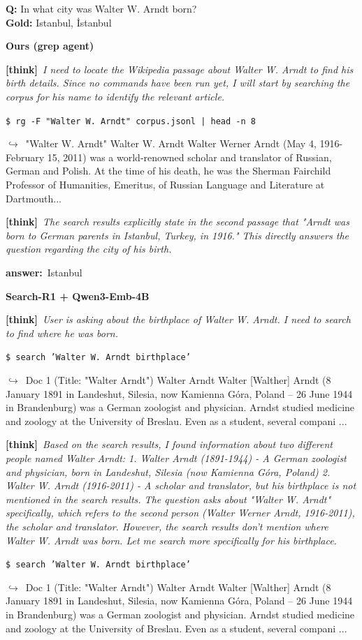 \documentclass{llmxive}
\providecommand{\cmark}{\ding{51}}
\providecommand{\xmark}{\ding{55}}
\providecommand{\winbadge}{\colorbox{green!50!black}{\scriptsize\bfseries\,WIN\,}}
\providecommand{\thk}[1]{{\footnotesize\textbf{[think]}\ \textit{#1}\par}}
\providecommand{\cmd}[1]{{\footnotesize\texttt{\$\ #1}\par}}
\providecommand{\retr}[1]{{\footnotesize\quad$\hookrightarrow$\ #1\par}}
\providecommand{\ans}[1]{{\footnotesize\textbf{answer:}\ #1\par}}
\begin{document}
\begin{cmpbox}[label={ex:popqa-arndt},title={\winbadge\ \ \textsc{PopQA -- exact name beats semantic blur}}]
\textbf{Q:} In what city was Walter W. Arndt born?\\[1pt]
\textbf{Gold:} Istanbul, İstanbul\par\smallskip
\textbf{Ours (grep agent)}~\cmark\par
  \thk{I need to locate the Wikipedia passage about Walter W. Arndt to find his birth details. Since no commands have been run yet, I will start by searching the corpus for his name to identify the relevant article.}
  \cmd{rg -F "Walter W. Arndt" corpus.jsonl | head -n 8}
  \retr{"Walter W. Arndt" Walter W. Arndt Walter Werner Arndt (May 4, 1916-February 15, 2011) was a world-renowned scholar and translator of Russian, German and Polish. At the time of his death, he was the Sherman Fairchild Professor of Humanities, Emeritus, of Russian Language and Literature at Dartmouth...}
  \thk{The search results explicitly state in the second passage that "Arndt was born to German parents in Istanbul, Turkey, in 1916." This directly answers the question regarding the city of his birth.}
  \ans{Istanbul}
\smallskip\par\textbf{Search-R1 + Qwen3-Emb-4B}~\xmark\par
  \thk{User is asking about the birthplace of Walter W. Arndt. I need to search to find where he was born.}
  \cmd{search 'Walter W. Arndt birthplace'}
  \retr{Doc 1 (Title: "Walter Arndt") Walter Arndt Walter [Walther] Arndt (8 January 1891 in Landeshut, Silesia, now Kamienna Góra, Poland – 26 June 1944 in Brandenburg) was a German zoologist and physician. Arndst studied medicine and zoology at the University of Breslau. Even as a student, several compani ...}
  \thk{Based on the search results, I found information about two different people named Walter Arndt: 1. Walter Arndt (1891-1944) - A German zoologist and physician, born in Landeshut, Silesia (now Kamienna Góra, Poland) 2. Walter W. Arndt (1916-2011) - A scholar and translator, but his birthplace is not mentioned in the search results. The question asks about "Walter W. Arndt" specifically, which refers to the second person (Walter Werner Arndt, 1916-2011), the scholar and translator. However, the search results don't mention where Walter W. Arndt was born. Let me search more specifically for his birthplace.}
  \cmd{search 'Walter W. Arndt birthplace'}
  \retr{Doc 1 (Title: "Walter Arndt") Walter Arndt Walter [Walther] Arndt (8 January 1891 in Landeshut, Silesia, now Kamienna Góra, Poland – 26 June 1944 in Brandenburg) was a German zoologist and physician. Arndst studied medicine and zoology at the University of Breslau. Even as a student, several compani ...}

\end{cmpbox}
\end{document}
